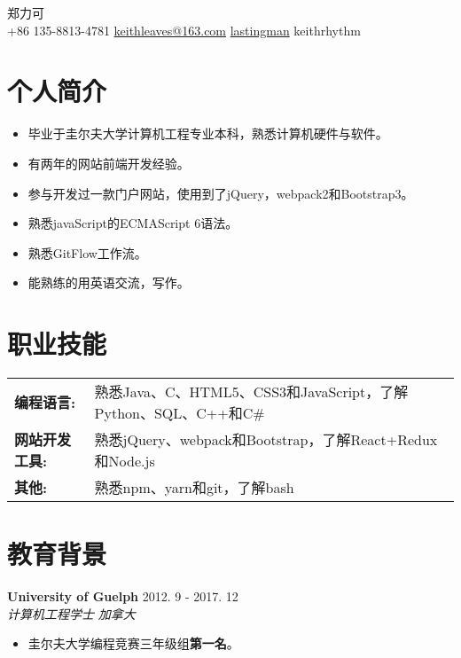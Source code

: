 \documentclass[10pt, letterpaper]{article}
\makeatletter
\newcommand*{\nametitle}[1]{{\fontsize{32pt}{1em}\color{awesome-emerald} #1 \\[0.6\baselineskip]}}
\newcommand*{\subinfo}[2]{\hspace{5pt} {\color{darktext}#1} \hspace*{2pt} {\color{lighttext}#2} \hspace{5pt}}
\newcommand{\information}[4]{
	\noindent
    \textbf{\color{darktext}#1} \hfill {#2} \\
    \textit{\color{hardtext}#3} \hfill \textit{\color{awesome-emerald}#4}
}
\newenvironment{skills}{
    \noindent
    \begin{tabular}{@{}l l@{}}
}{
    \end{tabular}
}
\newcommand*{\skill}[2]{
	\textbf{\color{darktext}#1} & {#2} \\
}
\makeatother
\begin{document}
\begin{center}
\nametitle{郑力可}
\subinfo{\faPhoneSquare}{+86 135-8813-4781}
\subinfo{\faEnvelope}{\href{mailto: keithleaves@163.com}{keithleaves@163.com}}
\subinfo{\faGithub}{\href{https://github.com/lastingman}{lastingman}}
\subinfo{\faWechat}{keithrhythm}
\end{center}


\color{lighttext}

\section*{个人简介}
\noindent
\begin{itemize}[leftmargin=*]
    \item 毕业于圭尔夫大学计算机工程专业本科，熟悉计算机硬件与软件。
    \item 有两年的网站前端开发经验。
    \item 参与开发过一款门户网站，使用到了jQuery，webpack2和Bootstrap3。
    \item 熟悉javaScript的ECMAScript 6语法。
    \item 熟悉GitFlow工作流。
    \item 能熟练的用英语交流，写作。
\end{itemize}

\section*{职业技能}
\begin{skills}
\skill{编程语言:}{熟悉Java、C、HTML5、CSS3和JavaScript，了解Python、SQL、C++和C\#}
\skill{网站开发工具:}{熟悉jQuery、webpack和Bootstrap，了解React+Redux和Node.js}
\skill{其他:}{熟悉npm、yarn和git，了解bash}
\end{skills}

\section*{教育背景}

\information
	{University of Guelph}{2012. 9 - 2017. 12}
	{计算机工程学士}{加拿大}
\begin{itemize}[leftmargin=*]
\item 圭尔夫大学编程竞赛三年级组\textbf{第一名}。
\end{itemize}
\end{document}
